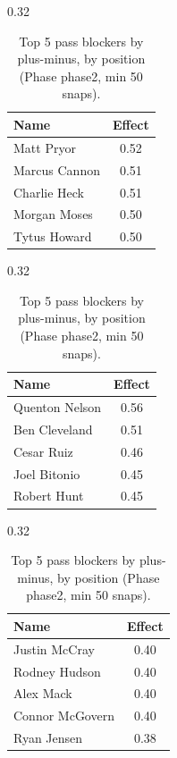\begin{table}[h!]
\centering
\begin{subtable}{0.32\textwidth}
\centering
\footnotesize
\begin{tabular}{lc}
\toprule
Name & Effect \\
\midrule
Matt Pryor & 0.52 \\
Marcus Cannon & 0.51 \\
Charlie Heck & 0.51 \\
Morgan Moses & 0.50 \\
Tytus Howard & 0.50 \\
\bottomrule
\end{tabular}
\caption{T}
\end{subtable}
\hfill
\begin{subtable}{0.32\textwidth}
\centering
\footnotesize
\begin{tabular}{lc}
\toprule
Name & Effect \\
\midrule
Quenton Nelson & 0.56 \\
Ben Cleveland & 0.51 \\
Cesar Ruiz & 0.46 \\
Joel Bitonio & 0.45 \\
Robert Hunt & 0.45 \\
\bottomrule
\end{tabular}
\caption{G}
\end{subtable}
\hfill
\begin{subtable}{0.32\textwidth}
\centering
\footnotesize
\begin{tabular}{lc}
\toprule
Name & Effect \\
\midrule
Justin McCray & 0.40 \\
Rodney Hudson & 0.40 \\
Alex Mack & 0.40 \\
Connor McGovern & 0.40 \\
Ryan Jensen & 0.38 \\
\bottomrule
\end{tabular}
\caption{C}
\end{subtable}
\caption{Top 5 pass blockers by plus-minus, by position (Phase phase2, min 50 snaps).}
\label{tab:blocker_pm_phase2_top}
\end{table}

